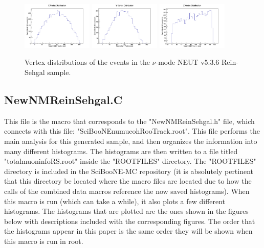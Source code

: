 \documentclass[11pt]{article}
\begin{document}
\begin{figure}[H]
\centering
\includegraphics[width=0.3\textwidth]{NewNMReinSehgalImages/4-XVertexDistributionNMRS.png}
\includegraphics[width=0.3\textwidth]{NewNMReinSehgalImages/3-YVertexDistributionNMRS.png}
\includegraphics[width=0.3\textwidth]{NewNMReinSehgalImages/2-ZVertexDistributionNMRS.png}
\caption{Vertex distributions of the events in the $\nu$-mode NEUT v5.3.6 Rein-Sehgal sample.}
\label{fig:app:vertexdistributionRSapp}
\end{figure}





\subsection{NewNMReinSehgal.C}
\label{sub:NewNMReinSehgal.C}
This file is the macro that corresponds to the "NewNMReinSehgal.h" file, which connects with this file: "SciBooNE\textunderscore numu\textunderscore coh\textunderscore RooTrack.root". This file performs the main analysis for this generated sample, and then organizes the information into many different histograms. The histograms are then written to a file titled "totalmuoninfoRS.root" inside the "ROOTFILES" directory. The "ROOTFILES" directory is included in the SciBooNE-MC repository (it is absolutely pertinent that this directory be located where the macro files are located due to how the calls of the combined data macros reference the now saved histograms). When this macro is run (which can take a while), it also plots a few different histograms. The histograms that are plotted are the ones shown in the figures below with descriptions included with the corresponding figures. The order that the histograms appear in this paper is the same order they will be shown when this macro is run in root.
\end{document}
